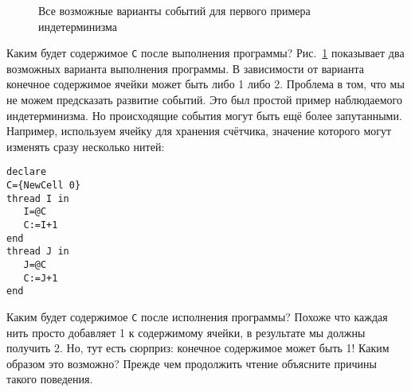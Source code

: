 \newcommand\execsample[6]{
  \draw [->] (#1, #2) -- (#1 + 8, #2);
  \draw (#1 + 1, #2 - 1) -- (#1 + 1, #2 + 1);
  \node [above] at (#1 + 1, #2 + 1) {#3};

  \draw (#1 + 4, #2 - 1) -- (#1 + 4, #2 + 1);
  \node [above] at (#1 + 4, #2 + 1) {#4};

  \draw (#1 + 6, #2 - 1) -- (#1 + 6, #2 + 1);
  \node [above] at (#1 + 6, #2 + 1) {#5};

  \node [text width=6cm, right] at (#1 + 8, #2) {#6};
}


\begin{figure}
\caption{Все возможные варианты событий для первого примера индетерминизма}
\label{figure:Executions_first_nondeterm_example}
\end{figure}

Каким будет содержимое \lstinline|C| после выполнения программы? Рис.~\ref{figure:Executions_first_nondeterm_example} показывает два возможных варианта выполнения программы. В зависимости от варианта конечное содержимое ячейки может быть либо 1 либо 2. Проблема в том, что мы не можем предсказать развитие событий. Это был простой пример наблюдаемого индетерминизма. Но происходящие события могут быть ещё более запутанными. Например, используем ячейку для хранения счётчика, значение которого могут изменять сразу несколько нитей:

\begin{lstlisting}
declare
C={NewCell 0}
thread I in
   I=@C
   C:=I+1
end
thread J in
   J=@C
   C:=J+1
end
\end{lstlisting}

Каким будет содержимое \lstinline|C| после исполнения программы? Похоже что каждая нить просто добавляет 1 к содержимому ячейки, в результате мы должны получить 2. Но, тут есть сюрприз: конечное содержимое может быть 1! Каким образом это возможно? Прежде чем продолжить чтение объясните причины такого поведения.

